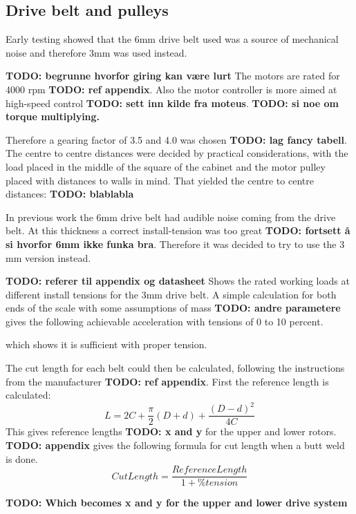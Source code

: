 \subsection{Drive belt and pulleys}
Early testing showed that the 6mm drive belt used was a source of mechanical noise and therefore 3mm was used instead.

\textbf{TODO: begrunne hvorfor giring kan være lurt}
The motors are rated for 4000 rpm \textbf{TODO: ref appendix}. Also the motor controller is more aimed at high-speed control \textbf{TODO: sett inn kilde fra moteus}. \textbf{TODO: si noe om torque multiplying.}

Therefore a gearing factor of 3.5 and 4.0 was chosen \textbf{TODO: lag fancy tabell}. The centre to centre distances were decided by practical considerations, with the load placed in the middle of the square of the cabinet and the motor pulley placed with distances to walls in mind. That yielded the centre to centre distances: \textbf{TODO: blablabla}

In previous work the 6mm drive belt had audible noise coming from the drive belt. At this thickness a correct install-tension was too great \textbf{TODO: fortsett å si hvorfor 6mm ikke funka bra}. Therefore it was decided to try to use the 3 mm version instead.

\textbf{TODO: referer til appendix og datasheet} Shows the rated working loads at different install tensions for the 3mm drive belt. A simple calculation for both ends of the scale with some assumptions of mass \textbf{TODO: andre parametere} gives the following achievable acceleration with tensions of 0 to 10 percent.

which shows it is sufficient with proper tension.

The cut length for each belt could then be calculated, following the instructions from the manufacturer \textbf{TODO: ref appendix}. First the reference length is calculated:
\begin{equation}
	L = 2C + \frac{\pi}{2}(D+d) + \frac{(D-d)^2}{4C}
	\label{eq:referece-length}
\end{equation}
This gives reference lengths \textbf{TODO: x and y} for the upper and lower rotors.
\textbf{TODO: appendix} gives the following formula for cut length when a butt weld is done.
\begin{equation}
	Cut Length = \frac{Reference Length}{1 + \% tension}
	\label{eq:cut-length}
\end{equation}

\textbf{TODO: Which becomes x and y for the upper and lower drive system}

